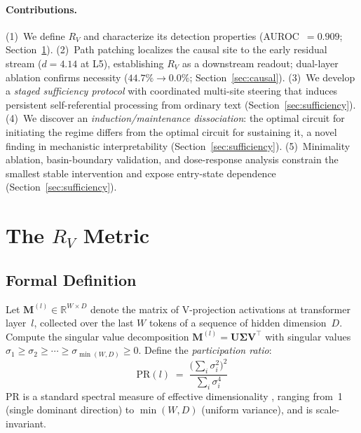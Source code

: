 \documentclass{article}
\newcommand{\RV}{R_V}
\newcommand{\PR}{\text{PR}}
\newcommand{\dcohen}{d}
\begin{document}
\paragraph{Contributions.}
(1)~We define $\RV$ and characterize its detection properties (AUROC~$= 0.909$;
Section~\ref{sec:metric}).
(2)~Path patching localizes the causal site to the early residual stream ($\dcohen = 4.14$ at L5),
establishing $\RV$ as a downstream readout; dual-layer ablation confirms necessity
($44.7\% \to 0.0\%$; Section~\ref{sec:causal}).
(3)~We develop a \emph{staged sufficiency protocol} with coordinated multi-site steering that
induces persistent self-referential processing from ordinary text
(Section~\ref{sec:sufficiency}).
(4)~We discover an \emph{induction/maintenance dissociation}: the optimal circuit for initiating
the regime differs from the optimal circuit for sustaining it, a novel finding in mechanistic
interpretability (Section~\ref{sec:sufficiency}).
(5)~Minimality ablation, basin-boundary validation, and dose-response analysis constrain the
smallest stable intervention and expose entry-state dependence
(Section~\ref{sec:sufficiency}).


\section{The $\RV$ Metric}
\label{sec:metric}

\subsection{Formal Definition}

Let $\mathbf{M}^{(l)} \in \mathbb{R}^{W \times D}$ denote the matrix of V-projection activations at
transformer layer~$l$, collected over the last $W$ tokens of a sequence of hidden dimension~$D$.
Compute the singular value decomposition $\mathbf{M}^{(l)} = \mathbf{U} \boldsymbol{\Sigma} \mathbf{V}^\top$
with singular values $\sigma_1 \geq \sigma_2 \geq \cdots \geq \sigma_{\min(W,D)} \geq 0$.
Define the \emph{participation ratio}:
\begin{equation}
    \PR(l) \;=\; \frac{\bigl(\sum_i \sigma_i^2\bigr)^2}{\sum_i \sigma_i^4}
    \label{eq:pr}
\end{equation}
$\PR$ is a standard spectral measure of effective dimensionality \citep{gao2017theory,
roy2007effective}, ranging from~1 (single dominant direction) to $\min(W, D)$ (uniform variance),
and is scale-invariant.
\end{document}
